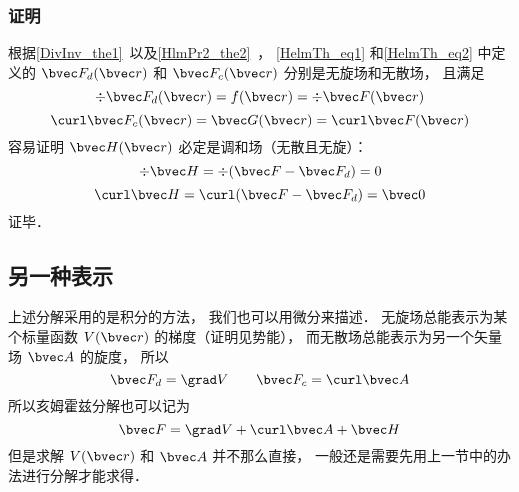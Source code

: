 \subsubsection{证明}
根据\autoref{DivInv_the1}~以及\autoref{HlmPr2_the2}~， \autoref{HelmTh_eq1} 和\autoref{HelmTh_eq2} 中定义的 $\bvec F_{d}(\bvec r)$ 和 $\bvec F_{c}(\bvec r)$ 分别是无旋场和无散场， 且满足
\begin{equation}
\div \bvec F_d(\bvec r) = f(\bvec r) = \div \bvec F(\bvec r)
\end{equation}
\begin{equation}
\curl \bvec F_c(\bvec r) = \bvec G(\bvec r) = \curl \bvec F(\bvec r)
\end{equation}
容易证明 $\bvec H(\bvec r)$ 必定是调和场（无散且无旋）：
\begin{equation}
\div \bvec H = \div (\bvec F - \bvec F_d) = 0
\end{equation}
\begin{equation}
\curl \bvec H = \curl (\bvec F - \bvec F_d) = \bvec 0
\end{equation}
证毕．

\subsection{另一种表示}
上述分解采用的是积分的方法， 我们也可以用微分来描述． 无旋场总能表示为某个标量函数 $V(\bvec r)$ 的梯度（证明见势能）， 而无散场总能表示为另一个矢量场 $\bvec A$ 的旋度， 所以
\begin{equation}
\bvec F_{d} = \grad V\qquad \bvec F_{c} = \curl \bvec A
\end{equation}
所以亥姆霍兹分解也可以记为
\begin{equation}
\bvec F = \grad V + \curl \bvec A + \bvec H
\end{equation}
但是求解 $V(\bvec r)$ 和 $\bvec A$ 并不那么直接， 一般还是需要先用上一节中的办法进行分解才能求得．
